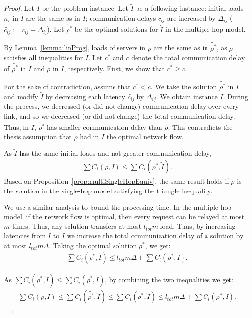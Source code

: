 \documentclass[11pt]{article}
\newcommand{\ltot}{{{l_{\mathit{tot}}}}}
\begin{document}
\begin{proof}
Let $I$ be the problem instance. Let $\tilde{I}$ be a following instance: initial loads $n_i$ in $\tilde{I}$ are the same as in $I$; communication delays $c_{ij}$ are increased by $\Delta_{ij}$ ($\tilde{c_{ij}} := c_{ij} + \Delta_{ij}$). Let $\tilde{\rho^*}$ be the optimal solutions for $\tilde{I}$ in the multiple-hop model.

By Lemma~\ref{lemma:linProg}, loads of servers in $\rho$ are the same as in $\tilde{\rho^*}$, as $\rho$ satisfies all inequalities for $\tilde{I}$. 
Let $c^{*}$ and $c$ denote the total communication delay of $\tilde{\rho^*}$ in $\tilde{I}$ and $\rho$ in $I$, respectively.
First, we show that $c^{*} \geq c$.

For the sake of contradiction, assume that $c^{*} < c$. We take the solution $\tilde{\rho^*}$ in $\tilde{I}$ and modify $\tilde{I}$ by decreasing each latency $\tilde{c_{ij}}$ by $\Delta_{ij}$. We obtain instance $I$.
During the process, we decreased (or did not change) communication delay over every link, and so we decreased (or did not change) the total communication delay. Thus, in $I$, $\tilde{\rho^*}$ has smaller communication delay than $\rho$. This contradicts the thesis assumption that $\rho$ had in $I$ the optimal network flow. 

As $\tilde{I}$ has the same initial loads and not greater communication delay,
\begin{align*}
\sum{C_i}(\rho, I) \leq \sum{C_i}(\tilde{\rho^*}, \tilde{I}) \textrm{.}
\end{align*}
Based on Proposition~\ref{prop:multiSingleHopEquiv}, the same result holds if $\rho$ is the solution in the single-hop model satisfying the triangle inequality.



We use a similar analysis to bound the processing time.
In the multiple-hop model, if the network flow is optimal, then every request can be relayed at most $m$ times. 
Thus, any solution transfers at most $\ltot m$ load. 
Thus, by increasing latencies from $I$ to $\tilde{I}$ we increase the total communication delay of a solution by at most $\ltot m \Delta$. Taking the optimal solution $\rho^*$, we get:
\begin{align*}
\sum{C_i}(\rho^{*}, \tilde{I}) \leq l_{\mathit{tot}} m \Delta + \sum{C_i}(\rho^{*}, I) \textrm{.}
\end{align*}

As $\sum{C_i}(\tilde{\rho^*}, \tilde{I}) \leq \sum{C_i}(\rho^{*}, \tilde{I})$, by combining the two inequalities we get:
\begin{align*}
\sum{C_i}(\rho, I) \leq \sum{C_i}(\tilde{\rho^*}, \tilde{I}) \leq \sum{C_i}(\rho^{*}, \tilde{I}) \leq l_{\mathit{tot}} m \Delta + \sum{C_i}(\rho^{*}, I) \textrm{.}
\end{align*}
\end{proof}
\end{document}
